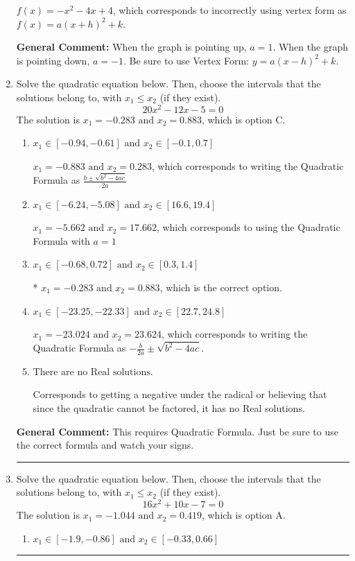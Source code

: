 \documentclass{extbook}[14pt]
\newcommand{\litem}[1]{\item #1

\rule{\textwidth}{0.4pt}}
\begin{document}
\begin{enumerate}
{\begin{enumerate}[label=\Alph*.]
$f(x)=-x^{2} -4 x + 4$, which corresponds to incorrectly using vertex form as $f(x) = a(x+h)^2+k$.
\end{enumerate}

\textbf{General Comment:} When the graph is pointing up, $a=1$. When the graph is pointing down, $a=-1$. Be sure to use Vertex Form: $y = a(x-h)^2+k$.
}
\litem{
Solve the quadratic equation below. Then, choose the intervals that the solutions belong to, with $x_1 \leq x_2$ (if they exist).
\[ 20x^{2} -12 x -5 = 0 \]The solution is \( x_1 = -0.283 \text{ and } x_2 = 0.883 \), which is option C.\begin{enumerate}[label=\Alph*.]
\item \( x_1 \in [-0.94, -0.61] \text{ and } x_2 \in [-0.1, 0.7] \)

 $x_1 = -0.883 \text{ and } x_2 = 0.283$, which corresponds to writing the Quadratic Formula as $\frac{b \pm \sqrt{b^2 - 4ac}}{2a}$
\item \( x_1 \in [-6.24, -5.08] \text{ and } x_2 \in [16.6, 19.4] \)

 $x_1 = -5.662 \text{ and } x_2 = 17.662$, which corresponds to using the Quadratic Formula with $a=1$
\item \( x_1 \in [-0.68, 0.72] \text{ and } x_2 \in [0.3, 1.4] \)

* $x_1 = -0.283 \text{ and } x_2 = 0.883$, which is the correct option.
\item \( x_1 \in [-23.25, -22.33] \text{ and } x_2 \in [22.7, 24.8] \)

 $x_1 = -23.024 \text{ and } x_2 = 23.624$, which corresponds to writing the Quadratic Formula as $-\frac{b}{2a} \pm \sqrt{b^2 - 4ac}$.
\item \( \text{There are no Real solutions.} \)

Corresponds to getting a negative under the radical or believing that since the quadratic cannot be factored, it has no Real solutions.
\end{enumerate}

\textbf{General Comment:} This requires Quadratic Formula. Just be sure to use the correct formula and watch your signs.
}
\litem{
Solve the quadratic equation below. Then, choose the intervals that the solutions belong to, with $x_1 \leq x_2$ (if they exist).
\[ 16x^{2} +10 x -7 = 0 \]The solution is \( x_1 = -1.044 \text{ and } x_2 = 0.419 \), which is option A.\begin{enumerate}[label=\Alph*.]
\item \( x_1 \in [-1.9, -0.86] \text{ and } x_2 \in [-0.33, 0.66] \)


\end{enumerate}}
\end{enumerate}
\end{document}
